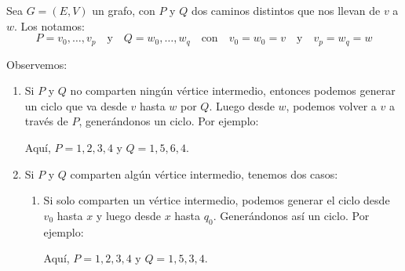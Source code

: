 \documentclass{article}
\begin{document}
Sea $G = (E,V)$ un grafo, con $P$ y $Q$ dos caminos distintos que nos llevan de $v$ a $w$. Los notamos:
\[ P = v_0, \ldots, v_p \quad \text{y} \quad Q = w_0, \ldots, w_q \quad \text{con} \quad v_0 = w_0 = v \quad \text{y} \quad v_p = w_q = w \]

Observemos:

\begin{enumerate}
    \item Si $P$ y $Q$ no comparten ningún vértice intermedio, entonces podemos generar un ciclo que va desde $v$ hasta $w$ por $Q$. Luego desde $w$, podemos volver a $v$ a través de $P$, generándonos un ciclo. Por ejemplo:
    \begin{center}
    \end{center}
    Aquí, $P = 1,2,3,4$ y $Q = 1,5,6,4$.
    
    \item Si $P$ y $Q$ comparten algún vértice intermedio, tenemos dos casos:
    \begin{enumerate}
        \item Si solo comparten un vértice intermedio, podemos generar el ciclo desde $v_0$ hasta $x$ y luego desde $x$ hasta $q_0$. Generándonos así un ciclo. Por ejemplo:
        \begin{center}
        \end{center}
        Aquí, $P = 1,2,3,4$ y $Q = 1,5,3,4$.
        

\end{enumerate}
\end{enumerate}
\end{document}
